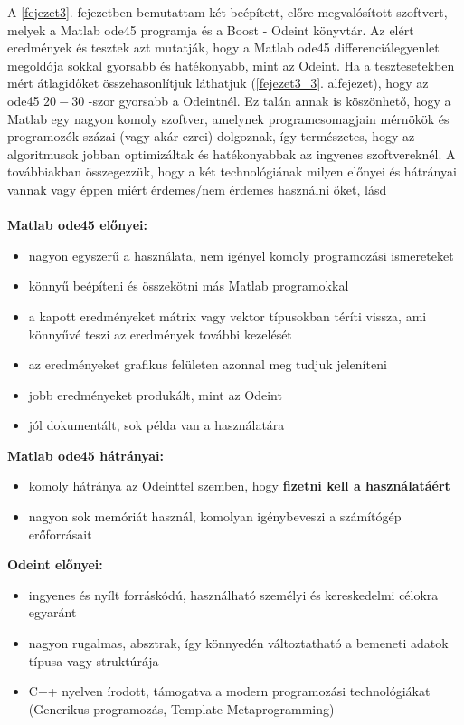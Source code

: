 A \ref{fejezet3}. fejezetben bemutattam két beépített, előre megvalósított szoftvert, melyek a Matlab ode45 programja és a Boost - Odeint könyvtár. Az elért eredmények és tesztek azt mutatják, hogy a Matlab ode45 differenciálegyenlet megoldója sokkal gyorsabb és hatékonyabb, mint az Odeint. Ha a tesztesetekben mért átlagidőket összehasonlítjuk láthatjuk (\ref{fejezet3_3}. alfejezet), hogy az ode45 $ 20-30 $ -szor gyorsabb a Odeintnél. Ez talán annak is köszönhető, hogy a Matlab egy nagyon komoly szoftver, amelynek programcsomagjain mérnökök és programozók százai  (vagy akár ezrei) dolgoznak, így természetes, hogy az algoritmusok jobban optimizáltak és hatékonyabbak az ingyenes szoftvereknél. A továbbiakban összegezzük, hogy a két technológiának milyen előnyei és hátrányai vannak vagy éppen miért érdemes/nem érdemes használni őket, l\'asd \cite{Lovasz}
\\ \\
\textbf{Matlab ode45 előnyei:}
\begin{itemize}
	\item nagyon egyszerű a használata, nem igényel komoly programozási ismereteket
	\item könnyű beépíteni és összekötni más Matlab programokkal
	\item a kapott eredményeket mátrix vagy vektor típusokban téríti vissza, ami könnyűvé teszi az eredmények további kezelését
	\item az eredményeket grafikus felületen azonnal meg tudjuk jeleníteni
	\item jobb eredményeket produkált, mint az Odeint
	\item jól dokumentált, sok példa van a használatára
\end{itemize}
\pagebreak
\textbf{Matlab ode45 hátrányai:}
\begin{itemize}
	\item komoly hátránya az Odeinttel szemben, hogy \textbf{fizetni kell a használatáért}
	\item nagyon sok memóriát használ, komolyan igénybeveszi a számítógép erőforrásait
\end{itemize}
\textbf{Odeint előnyei:}
\begin{itemize}
	\item ingyenes és nyílt forráskódú, használható személyi és kereskedelmi célokra egyaránt
	\item nagyon rugalmas, absztrak, így könnyedén változtatható a bemeneti adatok típusa vagy struktúrája 
	\item C++ nyelven írodott, támogatva a modern programozási technológiákat (Generikus programozás, Template Metaprogramming)
\end{itemize}
